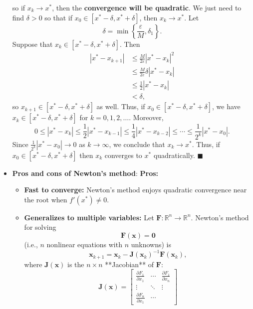 \documentclass{report}
\begin{document}
\begin{itemize}
    so if $x_k \to x^*$, then the \textbf{convergence will be quadratic}.
    \bigbreak \noindent 
    We just need to find $\delta > 0$ so that if $x_0 \in [x^* - \delta, x^* + \delta]$, then $x_k \to x^*$.
    Let
    $$\delta = \min\left\{\frac{\varepsilon}{M}, \delta_1\right\}.$$
    Suppose that $x_k \in [x^* - \delta, x^* + \delta]$. Then
    \begin{align*}
        \left|x^* - x_{k+1}\right| 
&\leq \frac{M}{2\varepsilon} \left|x^* - x_k\right|^2 \\
&\leq \frac{M}{2\varepsilon} \delta \left|x^* - x_k\right| \\
&\leq \frac{1}{2} \left|x^* - x_k\right| \\
&< \delta,
    \end{align*}
    so $x_{k+1} \in [x^* - \delta, x^* + \delta]$ as well. Thus, if $x_0 \in [x^* - \delta, x^* + \delta]$, we have $x_k \in [x^* - \delta, x^* + \delta]$ for $k = 0, 1, 2, \ldots$.
    \bigbreak \noindent 
    Moreover,
    $$0 \leq \left|x^* - x_k\right| \leq \frac12 \left|x^* - x_{k-1}\right| \leq \frac14 \left|x^* - x_{k-2}\right| \leq \cdots \leq \frac{1}{2^k} \left|x^* - x_{0}\right|.$$
    Since $\frac{1}{2^k} \left|x^* - x_{0}\right| \to 0$ as $k \to \infty$, we conclude that $x_k \to x^*$. Thus, if $x_0 \in [x^* - \delta, x^* + \delta]$ then $x_k$ converges to $x^*$ quadratically. $\blacksquare$
\item \textbf{Pros and cons of Newton's method}:
    \bigbreak \noindent 
    \textbf{Pros:}
    \begin{itemize}
        \item \textbf{Fast to converge:} Newton's method enjoys quadratic convergence near the root when $f'(x^*) \neq 0$.
        \item \textbf{Generalizes to multiple variables:} Let $\mathbf{F} \colon \mathbb{R}^n \to \mathbb{R}^n$. Newton's method for solving 
        $$\mathbf{F}(\mathbf{x}) = \mathbf{0}$$ 
        (i.e., $n$ nonlinear equations with $n$ unknowns) is
        $$ \mathbf{x}_{k+1} = \mathbf{x}_k - \mathbf{J}(\mathbf{x}_k)^{-1} \mathbf{F}(\mathbf{x}_k),$$
        where $\mathbf{J}(\mathbf{x})$ is the $n \times n$ **Jacobian** of $\mathbf{F}$:
        $$
        \mathbf{J}(\mathbf{x}) = 
        \begin{bmatrix}
            \frac{\partial F_1}{\partial x_1}& \cdots &
            \frac{\partial F_1}{\partial x_n}\\
            \vdots & \ddots & \vdots \\
            \frac{\partial F_n}{\partial x_1}& \cdots &

\end{bmatrix}$$
\end{itemize}
\end{itemize}
\end{document}
